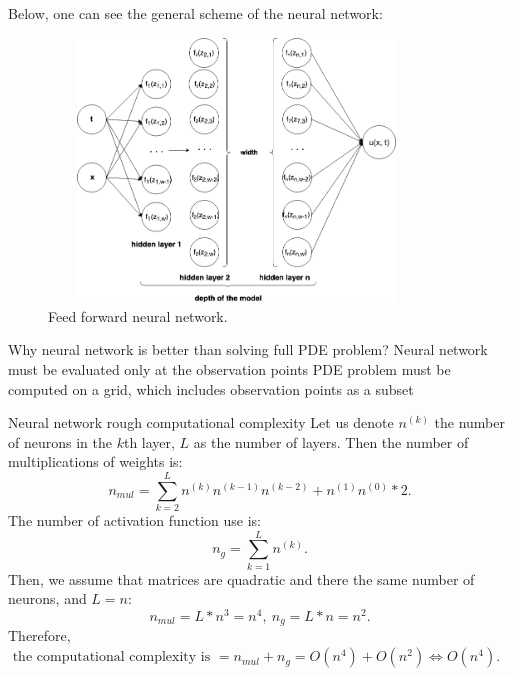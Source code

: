 \documentclass{beamer}
\def\\{}%
\begin{document}
\begin{frame}

Below, one can see the general scheme of the neural network:
\begin{figure}
\centering
\label{fig:network}
\includegraphics[width = 10cm , height = 7cm]{images/FFNN.png}
\\
\caption{Feed forward neural network.}
\end{figure}
\end{frame}

\begin{frame}{Why neural network is better than solving full PDE problem?}
Neural network must be evaluated only at the observation points\\
PDE problem must be computed on a grid, which includes observation points as a subset
\end{frame}

\begin{frame}{Neural network rough computational complexity}
    Let us denote $n^{(k)}$ the number of neurons in the $k$th layer, $L$ as the number of layers. Then the number of multiplications of weights is: $$n_{mul} = \sum_{k=2}^{L} n^{(k)}n^{(k-1)}n^{(k-2)} + n^{(1)}n^{(0)}*2.$$
    The number of activation function use is: $$n_g = \sum_{k = 1}^{L} n^{(k)}.$$     
    Then, we assume that matrices are quadratic and there the same number of neurons, and $L = n$:
    $$n_{mul} = L*n^3 = n^4, ~ n_g = L*n = n^2.$$
    Therefore, $ \text{ the computational complexity is } = n_{mul} + n_g = O(n^4) + O(n^2) \Longleftrightarrow O(n^4).$ 
\end{frame}
\end{document}
